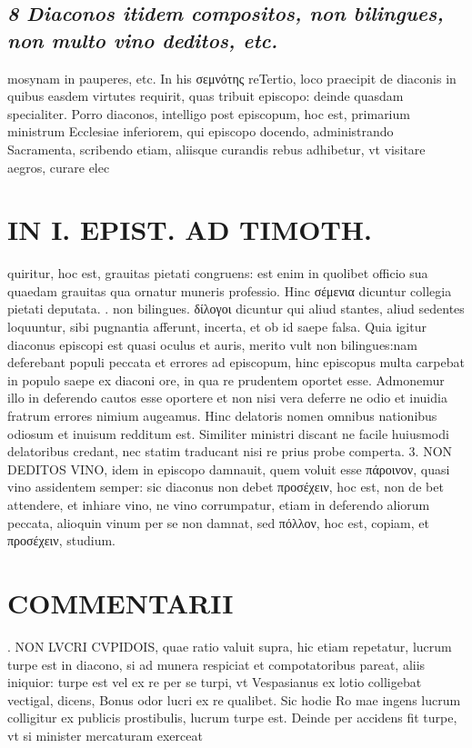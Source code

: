 \documentclass{article}
\begin{document}
\begin{pages}
\subsection*{\textit{8 Diaconos itidem compositos, non bilingues, non multo vino deditos, etc. }}\pstart mosynam in pauperes, etc. In his σεμνότης reTertio, loco praecipit de diaconis in quibus easdem virtutes requirit, quas tribuit episcopo: deinde quasdam specialiter. Porro diaconos, intelligo post episcopum, hoc est, primarium ministrum Ecclesiae inferiorem, qui episcopo docendo, administrando Sacramenta, scribendo etiam, aliisque curandis rebus adhibetur, vt visitare aegros, curare elec\pend
\section*{IN I. EPIST. AD TIMOTH. }
\marginpar{[ p.75 ]}\pstart quiritur, hoc est, grauitas pietati congruens: est enim in quolibet officio sua quaedam grauitas qua ornatur muneris professio. Hinc σέμενια dicuntur collegia pietati deputata.  \pend{}. non bilingues. δίλογοι dicuntur qui aliud stantes, aliud sedentes loquuntur, sibi pugnantia afferunt, incerta, et ob id saepe falsa. Quia igitur diaconus episcopi est quasi oculus et auris, merito vult non bilingues:nam deferebant populi peccata et errores ad episcopum, hinc episcopus multa carpebat in populo saepe ex diaconi ore, in qua re prudentem oportet esse. Admonemur illo in deferendo cautos esse oportere et non nisi vera deferre ne odio et inuidia fratrum errores nimium augeamus. Hinc delatoris nomen omnibus nationibus odiosum et inuisum redditum est.  \pend\pstart Similiter ministri discant ne facile huiusmodi delatoribus credant, nec statim traducant nisi re prius probe comperta. 3. NON DEDITOS VINO, idem in episcopo damnauit, quem voluit esse πάροινον, quasi vino assidentem semper: sic diaconus non debet προσέχειν, hoc est, non de bet attendere, et inhiare vino, ne vino corrumpatur, etiam in deferendo aliorum peccata, alioquin vinum per se non damnat, sed πόλλον, hoc est, copiam, et προσέχειν, studium.  \pend
\section*{COMMENTARII }
\marginpar{[ p.72 ]}. NON LVCRI CVPIDOIS, quae ratio valuit supra, hic etiam repetatur, lucrum turpe est in diacono, si ad munera respiciat et compotatoribus pareat, aliis iniquior: turpe est vel ex re per se turpi, vt Vespasianus ex lotio colligebat vectigal, dicens, Bonus odor lucri ex re qualibet. Sic hodie Ro mae ingens lucrum colligitur ex publicis prostibulis, lucrum turpe est. Deinde per accidens fit turpe, vt si minister mercaturam exerceat  \pend
{}
{}

\end{pages}
\end{document}
